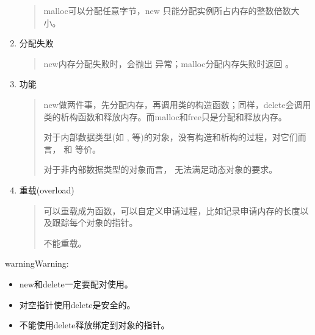 \documentclass[letterpaper,10pt,english]{sphinxmanual}
\begin{document}
\begin{enumerate}
\begin{quote}
malloc可以分配任意字节，new 只能分配实例所占内存的整数倍数大小。
\end{quote}

\item {} 
分配失败
\begin{quote}

new内存分配失败时，会抛出  异常；malloc分配内存失败时返回  。
\end{quote}

\item {} 
功能
\begin{quote}

new做两件事，先分配内存，再调用类的构造函数；同样，delete会调用类的析构函数和释放内存。而malloc和free只是分配和释放内存。

对于内部数据类型(如  ,  等)的对象，没有构造和析构的过程，对它们而言，  和  等价。

对于非内部数据类型的对象而言，  无法满足动态对象的要求。
\end{quote}

\item {} 
重载(overload)
\begin{quote}

 可以重载成为函数，可以自定义申请过程，比如记录申请内存的长度以及跟踪每个对象的指针。

 不能重载。
\end{quote}

\end{enumerate}

\begin{sphinxadmonition}{warning}{Warning:}\begin{itemize}
\item {} 
new和delete一定要配对使用。

\item {} 
对空指针使用delete是安全的。

\item {} 
不能使用delete释放绑定到对象的指针。

%
\begin{sphinxVerbatim}[commandchars=\\\{\}]
   
   
        
\end{sphinxVerbatim}

\end{itemize}
\end{sphinxadmonition}
\end{document}
